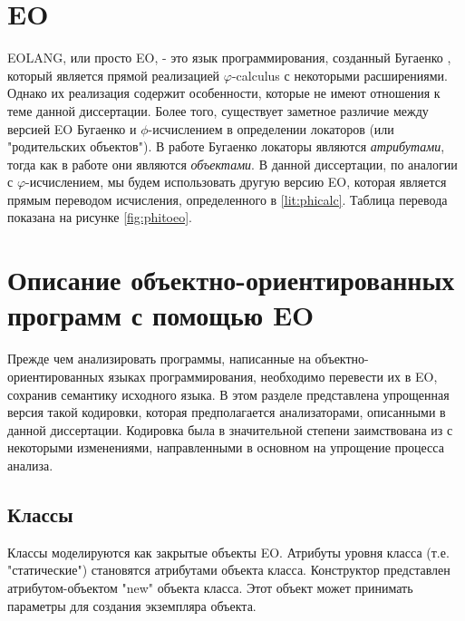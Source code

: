 


\section{EO}
\label{lit:eo}
EOLANG, или просто EO, - это язык программирования, созданный Бугаенко \cite{eolang}, который является прямой реализацией $\varphi$-calculus с некоторыми расширениями. Однако их реализация содержит особенности, которые не имеют отношения к теме данной диссертации. Более того, существует заметное различие между версией EO Бугаенко и $\phi$-исчислением \cite{kudasov} в определении локаторов (или "родительских объектов"). В работе Бугаенко локаторы являются \textit{атрибутами}, тогда как в работе \cite{kudasov} они являются \textit{объектами}. В данной диссертации, по аналогии с $\varphi$-исчислением, мы будем использовать другую версию EO, которая является прямым переводом исчисления, определенного в \ref{lit:phicalc}. Таблица перевода показана на рисунке \ref{fig:phitoeo}.



\section{Описание объектно-ориентированных программ с помощью EO}
\label{lit:encoding}
Прежде чем анализировать программы, написанные на объектно-ориентированных языках программирования, необходимо перевести их в EO, сохранив семантику исходного языка. В этом разделе представлена упрощенная версия такой кодировки, которая предполагается анализаторами, описанными в данной диссертации. Кодировка была в значительной степени заимствована из \cite{bugayenko_reducing_2021} с некоторыми изменениями, направленными в основном на упрощение процесса анализа.

\subsection{Классы}
Классы моделируются как закрытые объекты EO. Атрибуты уровня класса (т.е. "статические") становятся атрибутами объекта класса. Конструктор представлен атрибутом-объектом "new" объекта класса. Этот объект может принимать параметры для создания экземпляра объекта.

